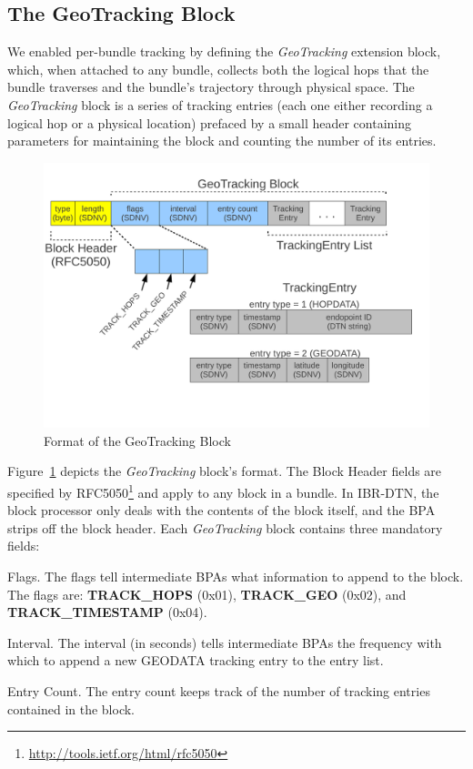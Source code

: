 \subsection{The GeoTracking Block}
We enabled per-bundle tracking by defining the {\em GeoTracking} extension block, which, when attached to any bundle, collects both the logical hops that the bundle traverses and the bundle's trajectory through physical space. The {\em GeoTracking} block is a series of tracking entries (each one either recording a logical hop or a physical location) prefaced by a small header containing parameters for maintaining the block and counting the number of its entries.
\begin{figure}[!b]
\vspace{-.25cm}
\begin{center}
\includegraphics[width=.9\columnwidth]{figures/tracking-block.pdf}
\end{center}
\vspace{-.75cm}
\caption{Format of the GeoTracking Block}
\label{fig:tracking-block}
\vspace{-.25cm}
\end{figure}

\begin{sloppypar}
Figure~\ref{fig:tracking-block} depicts the {\em GeoTracking} block's format. The Block Header fields are specified by RFC5050\footnote{\scriptsize\url{http://tools.ietf.org/html/rfc5050}} and apply to any block in a bundle. In IBR-DTN, the block processor only deals with the contents of the block itself, and the BPA strips off the block header. Each {\em GeoTracking} block contains three mandatory fields:
\begin{description*}
  \item[Flags.] The flags tell intermediate BPAs what information to append to the block. The flags are: {\bf TRACK\_HOPS} (0x01), {\bf TRACK\_GEO} (0x02), and {\bf TRACK\_TIMESTAMP} (0x04).
  \item[Interval.] The interval (in seconds) tells intermediate BPAs the frequency with which to append a new GEODATA tracking entry to the entry list.  
  \item[Entry Count.] The entry count keeps track of the number of tracking entries contained in the block.
\end{description*}
\end{sloppypar}

